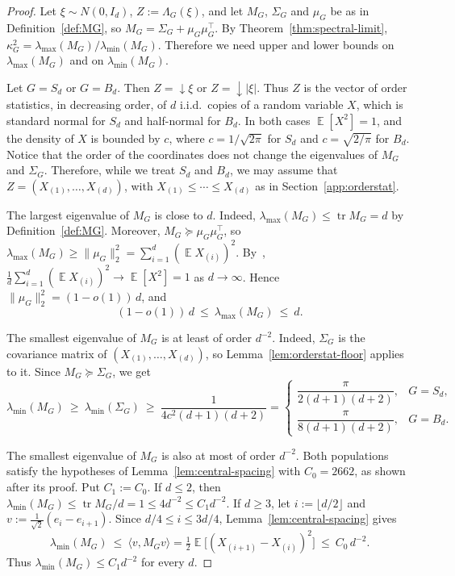 \documentclass[11pt]{article}
\newcommand{\inner}[2]{\langle #1, #2 \rangle}
\theoremstyle{definition}
\DeclareMathOperator{\EX}{\mathbb{E}}
\begin{document}
\begin{proof}
	Let $\xi\sim N(0,I_d)$, $Z:=\Lambda_G(\xi)$, and let $M_G$, $\Sigma_G$ and $\mu_G$ be as
	in Definition~\ref{def:MG}, so $M_G=\Sigma_G+\mu_G\mu_G^{\!\top}$. By
	Theorem~\ref{thm:spectral-limit}, $\kappa_G^2=\lambda_{\max}(M_G)/\lambda_{\min}(M_G)$. Therefore we need upper and lower bounds on $\lambda_{\max}(M_G)$ and on $\lambda_{\min}(M_G)$.
	
	Let $G=S_d$ or $G=B_d$. Then $Z={\downarrow}\xi$ or $Z={\downarrow}|\xi|$. Thus $Z$ is the vector of order statistics, in decreasing order, of $d$ i.i.d.\ copies of a random
	variable $X$, which is standard normal for $S_d$ and half-normal for $B_d$. In both cases
	$\EX[X^2]=1$, and the density of $X$ is bounded by $c$, where $c=1/\sqrt{2\pi}$ for $S_d$ and
	$c=\sqrt{2/\pi}$ for $B_d$. Notice that the order of the coordinates does not change the
	eigenvalues of $M_G$ and $\Sigma_G$. Therefore, while we treat $S_d$ and $B_d$, we may assume that
	$Z=(X_{(1)},\dots,X_{(d)})$, with $X_{(1)}\le\cdots\le X_{(d)}$ as in
	Section~\ref{app:orderstat}.
	
	The largest eigenvalue of $M_G$ is close to $d$. Indeed,
	$\lambda_{\max}(M_G)\le\operatorname{tr}M_G=d$ by Definition~\ref{def:MG}. Moreover, $M_G\succeq\mu_G\mu_G^{\!\top}$, so
	$\lambda_{\max}(M_G)\ge\|\mu_G\|_2^2=\sum_{i=1}^d(\EX X_{(i)})^2$. By~\cite[Thm.~1]{hoeffding1953},
	$\frac1d\sum_{i=1}^d(\EX X_{(i)})^2\to\EX[X^2]=1$ as $d\to\infty$. Hence
	$\|\mu_G\|_2^2=(1-o(1))\,d$, and
	\[
	(1-o(1))\,d\ \le\ \lambda_{\max}(M_G)\ \le\ d .
	\]
	
	The smallest eigenvalue of $M_G$ is at least of order $d^{-2}$. Indeed, $\Sigma_G$ is the
	covariance matrix of $(X_{(1)},\dots,X_{(d)})$, so Lemma~\ref{lem:orderstat-floor} applies to it. Since $M_G\succeq\Sigma_G$, we get
	\begin{equation}\label{eq:lmin-lower}
		\lambda_{\min}(M_G)\ \ge\ \lambda_{\min}(\Sigma_G)\ \ge\ \frac{1}{4c^2(d+1)(d+2)}
		=\begin{cases}
			\dfrac{\pi}{2(d+1)(d+2)}, & G=S_d,\\[1.5ex]
			\dfrac{\pi}{8(d+1)(d+2)}, & G=B_d.
		\end{cases}
	\end{equation}
	
	The smallest eigenvalue of $M_G$ is also at most of order $d^{-2}$. Both populations
	satisfy the hypotheses of Lemma~\ref{lem:central-spacing} with $C_0=2662$, as shown after its
	proof. Put $C_1:=C_0$. If $d\le2$, then
	$\lambda_{\min}(M_G)\le\operatorname{tr}M_G/d=1\le4d^{-2}\le C_1d^{-2}$. If $d\ge3$, let
	$i:=\lfloor d/2\rfloor$ and $v:=\frac1{\sqrt2}(e_i-e_{i+1})$. Since $d/4\le i\le3d/4$,
	Lemma~\ref{lem:central-spacing} gives
	\[
	\lambda_{\min}(M_G)\ \le\ \inner{v}{M_Gv}=\tfrac12\EX\bigl[(X_{(i+1)}-X_{(i)})^2\bigr]
	\ \le\ C_0\,d^{-2}.
	\]
	Thus $\lambda_{\min}(M_G)\le C_1d^{-2}$ for every $d$.
	

\end{proof}
\end{document}
